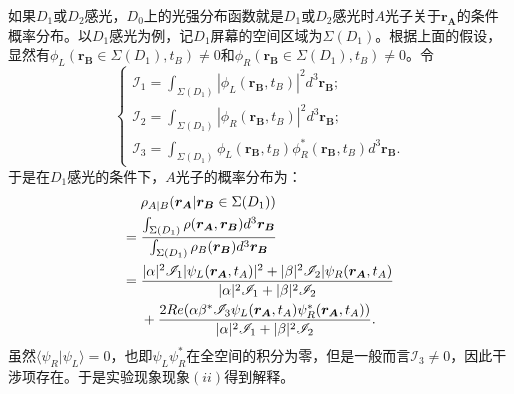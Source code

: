 如果$D_1$或$D_2$感光，$D_0$上的光强分布函数就是$D_1$或$D_2$感光时$A$光子关于$\boldsymbol{r_A}$的条件概率分布。以$D_1$感光为例，记$D_1$屏幕的空间区域为$\Sigma(D_1)$。根据上面的假设，显然有$\phi_L(\boldsymbol{r_B}\in\Sigma(D_1),t_B)\neq 0$和$\phi_R(\boldsymbol{r_B}\in\Sigma(D_1),t_B)\neq 0$。令
\begin{equation}
	\begin{cases}
	\mathscr{I}_1=\int_{\Sigma(D_1)}|\phi_L(\boldsymbol{r_B},t_B)|^2d^3\boldsymbol{r_B}; \\
	\mathscr{I}_2=\int_{\Sigma(D_1)}|\phi_R(\boldsymbol{r_B},t_B)|^2d^3\boldsymbol{r_B}; \\
	\mathscr{I}_3=\int_{\Sigma(D_1)}\phi_L(\boldsymbol{r_B},t_B)\phi_R^*(\boldsymbol{r_B},t_B)d^3\boldsymbol{r_B}.
	\end{cases}
\end{equation}
于是在$D_1$感光的条件下，$A$光子的概率分布为：
\begin{align}
&\rho_{A|B}(\boldsymbol{r_A}|\boldsymbol{r_B}\in\Sigma(D_1)) \notag \\
={}&\frac{\int_{\Sigma(D_1)}\rho(\boldsymbol{r_A},\boldsymbol{r_B})d^3\boldsymbol{r_B}}{\int_{\Sigma(D_1)}\rho_B(\boldsymbol{r_B})d^3\boldsymbol{r_B}} \notag \\
={}&\frac{|\alpha|^2\mathscr{I}_1|\psi_L(\boldsymbol{r_A},t_A)|^2+|\beta|^2\mathscr{I}_2|\psi_R(\boldsymbol{r_A},t_A)}{|\alpha|^2\mathscr{I}_1+|\beta|^2\mathscr{I}_2} \notag \\
&+\frac{2Re(\alpha\beta^*\mathscr{I}_3\psi_L(\boldsymbol{r_A},t_A)\psi_R^*(\boldsymbol{r_A},t_A))}{|\alpha|^2\mathscr{I}_1+|\beta|^2\mathscr{I}_2}.
\end{align}
虽然$\langle\psi_R|\psi_L\rangle=0$，也即$\psi_L\psi_R^*$在全空间的积分为零，但是一般而言$\mathscr{I}_3\neq 0$，因此干涉项存在。于是实验现象现象$(ii)$得到解释。
